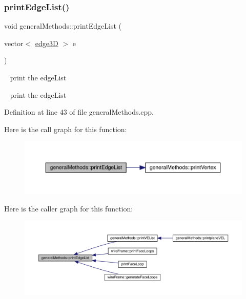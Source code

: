 \subsubsection{\texorpdfstring{print\+Edge\+List()}{printEdgeList()}}
{\footnotesize\ttfamily void general\+Methods\+::print\+Edge\+List (\begin{DoxyParamCaption}\item[{vector$<$ \mbox{\hyperlink{structedge3_d}{edge3D}} $>$}]{e }\end{DoxyParamCaption})}

~\newline
print the edge\+List

~\newline
print the edge\+List

Definition at line 43 of file general\+Methods.\+cpp.

Here is the call graph for this function\+:
\nopagebreak
\begin{figure}[H]
\begin{center}
\leavevmode
\includegraphics[width=350pt]{namespacegeneral_methods_ab6b6f8a5d92b39ead6c97ec0917b75a4_cgraph}
\end{center}
\end{figure}
Here is the caller graph for this function\+:
\nopagebreak
\begin{figure}[H]
\begin{center}
\leavevmode
\includegraphics[width=350pt]{namespacegeneral_methods_ab6b6f8a5d92b39ead6c97ec0917b75a4_icgraph}
\end{center}
\end{figure}
\mbox{\label{namespacegeneral_methods_a3474d24f9f545407bb5f73250a5e19d7}} 
